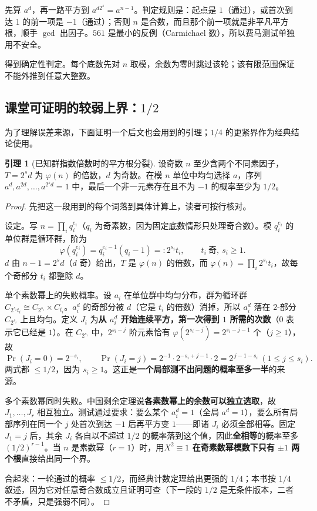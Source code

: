 \documentclass[UTF8,a4paper,11pt,twoside,openright,fontset=fandol]{ctexbook}
\theoremstyle{definition}
\newtheorem{lemma}[definition]{引理}
\begin{document}
\begin{tip}[读一条测试链的方法]
先算 $a^d$，再一路平方到 $a^{d2^s}=a^{n-1}$。判定规则是：起点是 $1$（通过），或首次到达 $1$ 的前一项是 $-1$（通过）；否则 $n$ 是合数，而且那个前一项就是非平凡平方根，顺手 $\gcd$ 出因子。$561$ 是最小的反例（Carmichael 数），所以费马测试单独用不安全。
\end{tip}

得到确定性判定。每个底数先对 $n$ 取模，余数为零时跳过该轮；该有限范围保证不能外推到任意大整数。


\subsection{课堂可证明的较弱上界：\texorpdfstring{$1/2$}{1/2}}
为了理解误差来源，下面证明一个后文也会用到的引理；$1/4$ 的更紧界作为经典结论使用。
\begin{lemma}[已知群指数倍数时的平方根分裂]
设奇数 $n$ 至少含两个不同素因子，$T=2^s d$ 为 $\varphi(n)$ 的倍数，$d$ 为奇数。在模 $n$ 单位中均匀选择 $a$，序列 $a^d,a^{2d},\ldots,a^{2^sd}=1$ 中，最后一个非一元素存在且不为 $-1$ 的概率至少为 $1/2$。
\end{lemma}
\begin{proof}
先把这一段用到的每个词落到具体计算上，读者可按行核对。

设定。写 $n=\prod_i q_i^{e_i}$（$q_i$ 为奇素数，因为固定底数情形只处理奇合数）。模 $q_i^{e_i}$ 的单位群是循环群，阶为
\[
 \varphi(q_i^{e_i})=q_i^{e_i-1}(q_i-1)=:2^{s_i}t_i,\qquad t_i\ \text{奇},\ s_i\ge1 .
\]
$d$ 由 $n-1=2^s d$（$d$ 奇）给出，$T$ 是 $\varphi(n)$ 的倍数，而 $\varphi(n)=\prod_i2^{s_i}t_i$，故每个奇部分 $t_i$ 都整除 $d$。

单个素数幂上的失败概率。设 $a_i$ 在单位群中均匀分布，群为循环群 $C_{2^{s_i}t_i}\cong C_{2^{s_i}}\times C_{t_i}$。$a_i^d$ 的奇部分被 $d$（它是 $t_i$ 的倍数）消掉，所以 $a_i^d$ 落在 $2$-部分 $C_{2^{s_i}}$ 上且均匀。定义 $J_i$ 为\textbf{从 $a_i^d$ 开始连续平方，第一次得到 $1$ 所需的次数}（$0$ 表示它已经是 $1$）。在 $C_{2^{s_i}}$ 中，$2^{s_i-j}$ 阶元素恰有 $\varphi(2^{s_i-j})=2^{s_i-j-1}$ 个（$j\ge1$），故
\[
 \Pr(J_i=0)=2^{-s_i},\qquad \Pr(J_i=j)=2^{-1}\cdot2^{-s_i+j-1}\cdot2=2^{\,j-1-s_i}\ (1\le j\le s_i).
\]
两式都 $\le1/2$，因为 $s_i\ge1$。这正是\textbf{一个局部测不出问题的概率至多一半}的来源。

多个素数幂同时失败。中国剩余定理说\textbf{各素数幂上的余数可以独立选取}，故 $J_1,\ldots,J_r$ 相互独立。测试通过要求：要么某个 $a_i^d=1$（全局 $a^d=1$），要么所有局部序列在同一个 $j$ 处首次到达 $-1$ 后再平方变 $1$——即诸 $J_i$ 必须全部相等。固定 $J_1=j$ 后，其余 $J_i$ 各自以不超过 $1/2$ 的概率落到这个值，因此\textbf{全相等}的概率至多 $(1/2)^{r-1}$。当 $n$ 是素数幂（$r=1$）时，用\textbf{$X^2\equiv1$ 在奇素数幂模数下只有 $\pm1$ 两个根}直接给出同一个界。

合起来：一轮通过的概率 $\le1/2$，而经典计数定理给出更强的 $1/4$；本书按 $1/4$ 叙述，因为它对任意奇合数成立且证明可查（下一段的 $1/2$ 是无条件版本，二者不矛盾，只是强弱不同）。
\end{proof}
\end{document}
